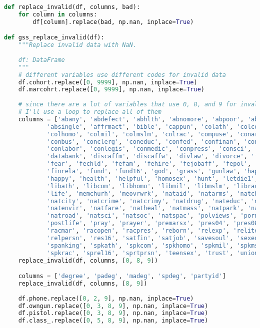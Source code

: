 \begin{lstlisting}[language=Python,style=source]
def replace_invalid(df, columns, bad):
    for column in columns:
        df[column].replace(bad, np.nan, inplace=True)

def gss_replace_invalid(df):
    """Replace invalid data with NaN.
    
    df: DataFrame
    """
    # different variables use different codes for invalid data
    df.cohort.replace([0, 9999], np.nan, inplace=True)
    df.marcohrt.replace([0, 9999], np.nan, inplace=True)
        
    # since there are a lot of variables that use 0, 8, and 9 for invalid data,
    # I'll use a loop to replace all of them
    columns = ['abany', 'abdefect', 'abhlth', 'abnomore', 'abpoor', 'abrape', 
            'absingle', 'affrmact', 'bible', 'cappun', 'colath', 'colcom', 
            'colhomo', 'colmil', 'colmslm', 'colrac', 'compuse', 'conarmy', 
            'conbus', 'conclerg', 'coneduc', 'confed', 'confinan', 'conjudge', 
            'conlabor', 'conlegis', 'conmedic', 'conpress', 'consci', 'contv', 
            'databank', 'discaffm', 'discaffw', 'divlaw', 'divorce', 'fair', 
            'fear', 'fechld', 'fefam', 'fehire', 'fejobaff', 'fepol', 'fepresch', 
            'finrela', 'fund', 'fund16', 'god', 'grass', 'gunlaw', 'hapmar', 
            'happy', 'health', 'helpful', 'homosex', 'hunt', 'letdie1', 
            'libath', 'libcom', 'libhomo', 'libmil', 'libmslm', 'librac', 
            'life', 'memchurh', 'meovrwrk', 'nataid', 'natarms', 'natchld', 
            'natcity', 'natcrime', 'natcrimy', 'natdrug', 'nateduc', 'natenrgy', 
            'natenvir', 'natfare', 'natheal', 'natmass', 'natpark', 'natrace', 
            'natroad', 'natsci', 'natsoc', 'natspac', 'polviews', 'pornlaw', 
            'postlife', 'pray', 'prayer', 'premarsx', 'pres04', 'pres08', 'pres12', 
            'racmar', 'racopen', 'racpres', 'reborn', 'relexp', 'reliten', 
            'relpersn', 'res16', 'satfin', 'satjob', 'savesoul', 'sexeduc', 
            'spanking', 'spkath', 'spkcom', 'spkhomo', 'spkmil', 'spkmslm', 
            'spkrac', 'sprel16', 'sprtprsn', 'teensex', 'trust', 'union_', 'xmarsex']
    replace_invalid(df, columns, [0, 8, 9])

    columns = ['degree', 'padeg', 'madeg', 'spdeg', 'partyid']
    replace_invalid(df, columns, [8, 9])
        
    df.phone.replace([0, 2, 9], np.nan, inplace=True)
    df.owngun.replace([0, 3, 8, 9], np.nan, inplace=True)
    df.pistol.replace([0, 3, 8, 9], np.nan, inplace=True)
    df.class_.replace([0, 5, 8, 9], np.nan, inplace=True)
    

\end{lstlisting}
